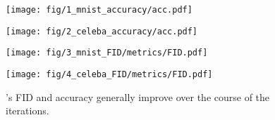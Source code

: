 \begin{figure*}[!t]
\centering
\begin{minipage}{0.2\textwidth}
  \centering
\texttt{[image: fig/1\_mnist\_accuracy/acc.pdf]}
\end{minipage}%
\begin{minipage}{0.2\textwidth}
  \centering
\texttt{[image: fig/2\_celeba\_accuracy/acc.pdf]}
\end{minipage}%
\begin{minipage}{0.2\textwidth}
  \centering
\texttt{[image: fig/3\_mnist\_FID/metrics/FID.pdf]}
\end{minipage}
\begin{minipage}{0.2\textwidth}
  \centering
\texttt{[image: fig/4\_celeba\_FID/metrics/FID.pdf]}
\end{minipage}
\caption{\simpe{}'s FID and accuracy generally improve over the course of the \pe{} iterations.} \label{fig:metrics_vs_iterations}
\vspace{-0.3cm}
\end{figure*}